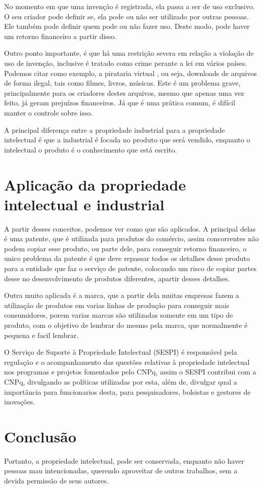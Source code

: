 \documentclass[12pt]{article}
\begin{document}
No momento em que uma invenção é registrada, ela passa a ser de uso exclusivo. O seu criador pode definir se, ela pode ou não ser utilizado por outras pessoas. Ele também pode definir quem pode ou não fazer uso. Deste modo, pode haver um retorno financeiro a partir disso.

Outro ponto importante, é que há uma restrição severa em relação a violação de uso de invenção, inclusive é tratado como crime perante a lei em vários países. Podemos citar como exemplo, a pirataria virtual \cite{PIRATE}, ou seja, downloads de arquivos de forma ilegal, tais como filmes, livros, músicas. Este é um problema grave, principalmente para os criadores destes arquivos, mesmo que apenas uma vez feito, já geram prejuízos financeiros. Já que é uma prática comum, é difícil manter o controle sobre isso.

A principal diferença entre a propriedade industrial para a propriedade intelectual é que a
industrial é focada no produto que será vendido, enquanto o intelectual o produto é o
conhecimento que está escrito.

\section{Aplicação da propriedade intelectual e industrial} \label{sec:aplicacao}

A partir desses conceitos, podemos ver como que são aplicados.
A principal delas é uma patente, que é utilizada para produtos do comércio,
assim concorrentes não podem copiar esse produto, ou parte dele, para conseguir retorno
financeiro, o unico problema da patente é que deve repassar todos os detalhes desse produto
para a entidade que faz o serviço de patente, colocando um risco de copiar partes desse
no desenvolvimento de produtos diferentes, apartir desses detalhes.

Outra muito aplicada é a marca, que a partir dela muitas empresas fazem a utilização de
produtos em varias linhas de produção para conseguir mais consumidores, porem varias marcas
são utilizadas somente em um tipo de produto, com o objetivo de lembrar do mesmo pela marca,
que normalmente é pequena e facil lembrar.

O Serviço de Suporte à Propriedade Intelectual (SESPI) é responsável pela regulação e o acompanhamento das questões relativas à propriedade intelectual nos programas e projetos fomentados pelo CNPq\cite{CNPQ}, assim o SESPI contribui com a CNPq, divulgando as políticas
utilizadas por esta, além de, divulgar qual a importância para funcionarios desta, para pesquisadores, bolsistas e gestores de inovações.

\section{Conclusão}\label{sec:conclusao}
Portanto, a propriedade intelectual, pode ser conservada, enquanto não haver pessoas mau intencionadas, querendo aproveitar de outros trabalhos, sem a devida permissão de seus autores.



\end{document}
